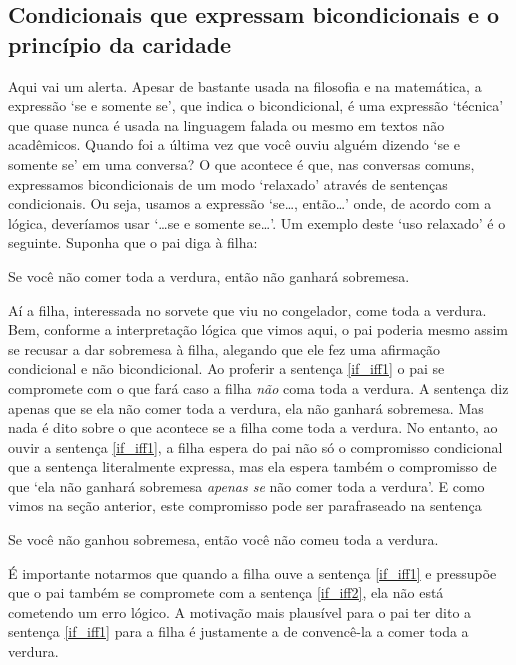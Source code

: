 \subsection{Condicionais que expressam bicondicionais e o princípio da caridade}
Aqui vai um alerta.
Apesar de bastante usada na filosofia e na matemática, a expressão `se e somente se', que indica o bicondicional, é uma expressão `técnica' que quase nunca é usada na linguagem falada ou mesmo em textos não acadêmicos.
Quando foi a última vez que você ouviu alguém dizendo `se e somente se' em uma conversa?
O que acontece é que, nas conversas comuns, expressamos bicondicionais de um modo `relaxado' através de sentenças condicionais.
Ou seja, usamos a expressão `se\ldots, então\ldots' onde, de acordo com a lógica, deveríamos usar  `\ldots{}se e somente se\ldots'.
Um exemplo deste `uso relaxado' é o seguinte.
Suponha que o pai diga à filha:
	\begin{earg}
		\item[\ex{if_iff1}] Se você não comer toda a verdura, então não ganhará sobremesa.
	\end{earg}
Aí a filha, interessada no sorvete que viu no congelador, come toda a verdura.
Bem, conforme a interpretação lógica que vimos aqui, o pai poderia mesmo assim se recusar a dar sobremesa à filha, alegando que ele fez uma afirmação condicional e não bicondicional.
Ao proferir a sentença \ref{if_iff1} o pai se compromete com o que fará caso a filha \emph{não} coma toda a verdura.
A sentença diz apenas que se ela não comer toda a verdura, ela não ganhará sobremesa.
Mas nada é dito sobre o que acontece se a filha come toda a verdura.
No entanto, ao ouvir a sentença \ref{if_iff1}, a filha espera do pai não só o compromisso condicional que a sentença literalmente expressa, mas ela espera também o compromisso de que `ela não ganhará sobremesa \emph{apenas se} não comer toda a verdura'.
E como vimos na seção anterior, este compromisso pode ser parafraseado na sentença
\begin{earg}
		\item[\ex{if_iff2}] Se você não ganhou sobremesa, então você não comeu toda a verdura.
	\end{earg}
É importante notarmos que quando a filha ouve a sentença \ref{if_iff1} e pressupõe que o pai também se compromete com a sentença \ref{if_iff2}, ela não está cometendo um erro lógico.
A motivação mais plausível para o pai ter dito a sentença \ref{if_iff1} para a filha é justamente a de convencê-la a comer toda a verdura.
